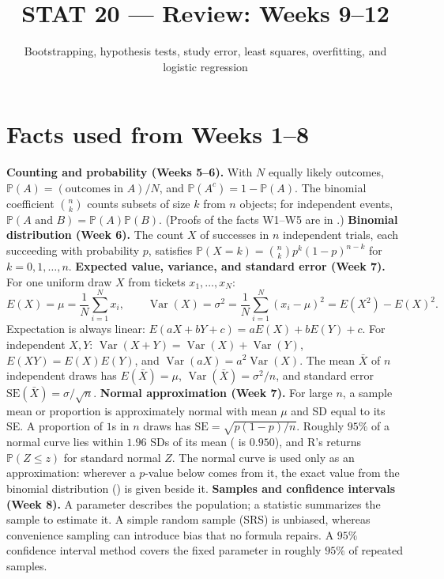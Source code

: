 \documentclass[10pt]{scrartcl}
\title{STAT 20 --- Review: Weeks 9--12}
\subtitle{Bootstrapping, hypothesis tests, study error, least squares, overfitting, and logistic regression}
\author{}\date{}\ihead{}
\begin{document}
\maketitle

\section{Facts used from Weeks 1--8}
\begin{enumerate}[label=(W\arabic*),leftmargin=2.8em,itemsep=4pt]
  \ii {}\textbf{Counting and probability (Weeks 5--6).} With $N$ equally likely outcomes, $\mathbb P(A) = (\text{outcomes in }A)/N$, and $\mathbb P(A^c) = 1 - \mathbb P(A)$. The binomial coefficient $\binom{n}{k}$ counts subsets of size $k$ from $n$ objects; for independent events, $\mathbb P(A\text{ and }B) = \mathbb P(A)\mathbb P(B)$. (Proofs of the facts W1--W5 are in .)
  \ii {}\textbf{Binomial distribution (Week 6).} The count $X$ of successes in $n$ independent trials, each succeeding with probability $p$, satisfies $\mathbb P(X = k) = \binom{n}{k}p^k(1-p)^{n-k}$ for $k=0,1,\dots,n$.
  \ii {}\textbf{Expected value, variance, and standard error (Week 7).} For one uniform draw $X$ from tickets $x_1,\dots,x_N$:
  \[
    E(X) = \mu = \frac{1}{N}\sum_{i=1}^N x_i, \qquad \operatorname{Var}(X) = \sigma^2 = \frac{1}{N}\sum_{i=1}^N (x_i - \mu)^2 = E(X^2) - E(X)^2.
  \]
  Expectation is always linear: $E(aX+bY+c) = aE(X)+bE(Y)+c$. For independent $X,Y$: $\operatorname{Var}(X+Y) = \operatorname{Var}(X)+\operatorname{Var}(Y)$, $E(XY) = E(X)E(Y)$, and $\operatorname{Var}(aX) = a^2\operatorname{Var}(X)$. The mean $\bar X$ of $n$ independent draws has $E(\bar X)=\mu$, $\operatorname{Var}(\bar X)=\sigma^2/n$, and standard error $\mathrm{SE}(\bar X) = \sigma/\sqrt{n}$.
  \ii {}\textbf{Normal approximation (Week 7).} For large $n$, a sample mean or proportion is approximately normal with mean $\mu$ and SD equal to its SE. A proportion of $1$s in $n$ draws has $\mathrm{SE} = \sqrt{p(1-p)/n}$. Roughly $95\%$ of a normal curve lies within $1.96$ SDs of its mean ( is $0.950$), and R's  returns $\mathbb P(Z \le z)$ for standard normal $Z$. The normal curve is used only as an approximation: wherever a $p$-value below comes from it, the exact value from the binomial distribution () is given beside it.
  \ii {}\textbf{Samples and confidence intervals (Week 8).} A parameter describes the population; a statistic summarizes the sample to estimate it. A simple random sample (SRS) is unbiased, whereas convenience sampling can introduce bias that no formula repairs. A $95\%$ confidence interval method covers the fixed parameter in roughly $95\%$ of repeated samples.

\end{enumerate}
\end{document}

